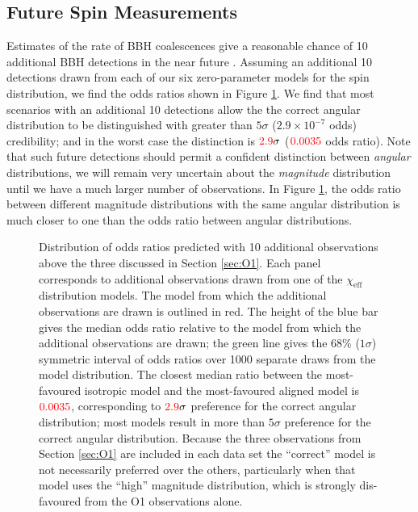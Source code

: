 \documentclass[modern,linenumbers]{aastex61}
\newcommand{\chieff}{\chi_\mathrm{eff}}
\newcommand{\checkme}[1]{\textcolor{red}{#1}}
\newcommand{\OTwoSigmaIsoAlignedMin}{\checkme{2.9}}
\newcommand{\OTwoOddsIsoAlignedMin}{\checkme{0.0035}}
\begin{document}
\subsection{Future Spin Measurements}
\label{subsec:future}

Estimates of the rate of \ac{BBH} coalescences give a reasonable
chance of 10 additional \ac{BBH} detections in the near future
\citep{O1-BBH,2016ApJ...833L...1A,2016ApJS..227...14A}.  Assuming an
additional 10 detections drawn from each of our six zero-parameter
models for the spin distribution, we find the odds ratios shown in
Figure \ref{fig:O2-predictions}.  We find that most scenarios with an
additional 10 detections allow the the correct angular distribution to
be distinguished with greater than $5\sigma$ ($2.9 \times 10^{-7}$
odds) credibility; and in the worst case the distinction is
$\OTwoSigmaIsoAlignedMin\sigma$ ($\OTwoOddsIsoAlignedMin$ odds ratio).
Note that such future detections should permit a confident distinction
between \emph{angular} distributions, we will remain very uncertain
about the \emph{magnitude} distribution until we have a much larger
number of observations.  In Figure \ref{fig:O2-predictions}, the odds
ratio between different magnitude distributions with the same angular
distribution is much closer to one than the odds ratio between angular
distributions.

\begin{figure}
  \caption{\label{fig:O2-predictions} Distribution of odds ratios
    predicted with 10 additional observations above the three
    discussed in Section \ref{sec:O1}.  Each panel corresponds to
    additional observations drawn from one of the $\chieff$
    distribution models.  The model from which the additional
    observations are drawn is outlined in red.  The height of the blue
    bar gives the median odds ratio relative to the model from which
    the additional observations are drawn; the green line gives the
    68\% ($1 \sigma$) symmetric interval of odds ratios over 1000
    separate draws from the model distribution.  The closest median
    ratio between the most-favoured isotropic model and the
    most-favoured aligned model is $\OTwoOddsIsoAlignedMin$,
    corresponding to $\OTwoSigmaIsoAlignedMin\sigma$ preference for
    the correct angular distribution; most models result in more than
    $5\sigma$ preference for the correct angular distribution.
    Because the three observations from Section \ref{sec:O1} are
    included in each data set the ``correct'' model is not necessarily
    preferred over the others, particularly when that model uses the
    ``high'' magnitude distribution, which is strongly dis-favoured
    from the O1 observations alone.}
\end{figure}
\end{document}

